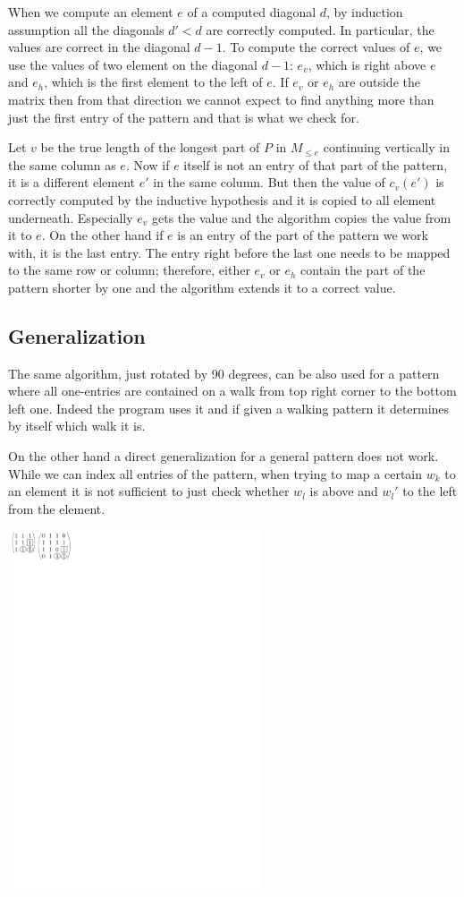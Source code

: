 When we compute an element $e$ of a computed diagonal $d$, by induction assumption all the diagonals $d'<d$ are correctly computed. In particular, the values are correct in the diagonal $d-1$. To compute the correct values of $e$, we use the values of two element on the diagonal $d-1$: $e_v$, which is right above $e$ and $e_h$, which is the first element to the left of $e$. If $e_v$ or $e_h$ are outside the matrix then from that direction we cannot expect to find anything more than just the first entry of the pattern and that is what we check for.

Let $v$ be the true length of the longest part of $P$ in $M_{\leq e}$ continuing vertically in the same column as $e$. Now if $e$ itself is not an entry of that part of the pattern, it is a different element $e'$ in the same column. But then the value of $c_v(e')$ is correctly computed by the inductive hypothesis and it is copied to all element underneath. Especially $e_v$ gets the value and the algorithm copies the value from it to $e$. On the other hand if $e$ is an entry of the part of the pattern we work with, it is the last entry. The entry right before the last one needs to be mapped to the same row or column; therefore, either $e_v$ or $e_h$ contain the part of the pattern shorter by one and the algorithm extends it to a correct value.

\subsection{Generalization}
The same algorithm, just rotated by 90 degrees, can be also used for a pattern where all one-entries are contained on a walk from top right corner to the bottom left one. Indeed the program uses it and if given a walking pattern it determines by itself which walk it is.

On the other hand a direct generalization for a general pattern does not work. While we can index all entries of the pattern, when trying to map a certain $w_k$ to an element it is not sufficient to just check whether $w_l$ is above and $w_l'$ to the left from the element.

\centerline{\mbox{\includegraphics[width=75mm]{../img/nogeneral.pdf}}}

